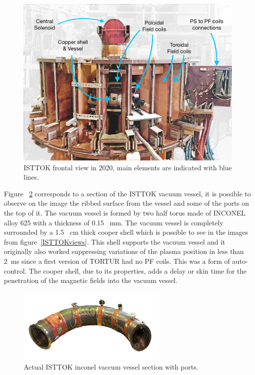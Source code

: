 \begin{figure}[htbp]
	\centering
	\includegraphics[width=1.1\textwidth]{Chp4/FrontISTTOK.png}
	\caption{\label{ISTTOK_front}ISTTOK frontal view in 2020, main elements are indicated with blue lines.   }
\end{figure}

Figure ~\ref{VV_IST} corresponds to a section of the ISTTOK vacuum vessel, it is possible to observe on the image the ribbed  surface from the vessel and some of the ports on the top of it. The vacuum vessel is formed by two half torus made of INCONEL alloy 625 with a thickness of 0.15~ mm. The vacuum vessel is completely surrounded by a 1.5 ~cm thick cooper shell which is possible to see in the images from figure~\ref{ISTTOKviews}. This shell supports the vacuum vessel and it originally  also worked suppressing  variations of the plasma position in less than 2~ms since a first version of TORTUR had no PF coils. This was a form of auto-control. The  cooper shell, due to its properties, adds a delay or skin time for the  penetration of the magnetic fields into the vacuum vessel.
\smallskip

\begin{figure}[htbp]
	\centering
	\includegraphics[width=0.65\textwidth]{Chp4/VacuumVessel_Low.png}
	\caption{\label{VV_IST} Actual ISTTOK inconel  vaccum vessel section with ports.  }
\end{figure}





